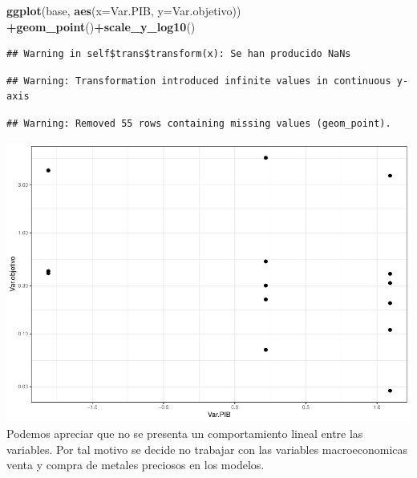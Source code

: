 \documentclass[
  11pt,
  a4paper,
]{book}
\newenvironment{Shaded}{\begin{snugshade}}{\end{snugshade}}
\newcommand{\DataTypeTok}[1]{\textcolor[rgb]{0.13,0.29,0.53}{#1}}
\newcommand{\KeywordTok}[1]{\textcolor[rgb]{0.13,0.29,0.53}{\textbf{#1}}}
\newcommand{\NormalTok}[1]{#1}
\newcommand{\OperatorTok}[1]{\textcolor[rgb]{0.81,0.36,0.00}{\textbf{#1}}}
\begin{document}
\begin{Shaded}
\begin{Highlighting}[]
\KeywordTok{ggplot}\NormalTok{(base, }\KeywordTok{aes}\NormalTok{(}\DataTypeTok{x=}\NormalTok{Var.PIB, }\DataTypeTok{y=}\NormalTok{Var.objetivo)) }\OperatorTok{+}\KeywordTok{geom_point}\NormalTok{()}\OperatorTok{+}\KeywordTok{scale_y_log10}\NormalTok{()}
\end{Highlighting}
\end{Shaded}

\begin{verbatim}
## Warning in self$trans$transform(x): Se han producido NaNs
\end{verbatim}

\begin{verbatim}
## Warning: Transformation introduced infinite values in continuous y-axis
\end{verbatim}

\begin{verbatim}
## Warning: Removed 55 rows containing missing values (geom_point).
\end{verbatim}

\includegraphics{index_files/figure-latex/unnamed-chunk-61-1.pdf}
Podemos apreciar que no se presenta un comportamiento lineal entre las
variables. Por tal motivo se decide no trabajar con las variables
macroeconomicas venta y compra de metales preciosos en los modelos.
\end{document}

